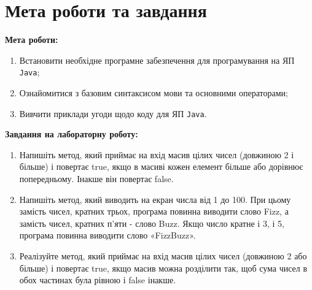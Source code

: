 \section{Мета роботи та завдання}

\textbf{Мета роботи:}
\begin{enumerate}
    \item Встановити необхідне програмне забезпечення для програмування на ЯП \texttt{Java};
    \item Ознайомитися з базовим синтаксисом мови та основними операторами;
    \item Вивчити приклади угоди щодо коду для ЯП \texttt{Java}.
\end{enumerate}

\skipline
\textbf{Завдання на лабораторну роботу:}
\begin{enumerate}
    \item 
    Напишіть метод, який приймає на вхід масив цілих чисел (довжиною 2 і більше) і 
    повертає true, якщо в масиві кожен елемент більше або дорівнює попередньому. Інакше він повертає false.
    \item 
    Напишіть метод, 
    який виводить на екран числа від 1 до 100. При цьому замість чисел, кратних трьох, 
    програма повинна виводити слово Fizz, а замість чисел, кратних п'яти - слово Buzz. 
    Якщо число кратне і 3, і 5, програма повинна виводити слово «FizzBuzz».
    \item 
    Реалізуйте метод, який приймає на вхід масив цілих чисел (довжиною 2 або більше) і повертає true, 
    якщо масив можна розділити так, щоб сума чисел в обох частинах була рівною і false інакше.
\end{enumerate}
